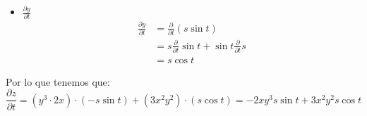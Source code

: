 \documentclass[12pt]{article}
\begin{document}
\begin{itemize}[format=\textbf]
\begin{itemize}
\begin{itemize}
   \item $\frac{\partial y}{\partial t}$
     \begin{align*}
      \frac{\partial y}{\partial t}  &=\frac{\partial}{\partial t}  \left(s \sin{t} \right)  \\
       &= s \frac{\partial}{\partial t}  \sin{t}   +  \sin{t} \frac{\partial}{\partial t}s \\
       &= s\cos{t}
     \end{align*}
  \end{itemize}
  Por lo que tenemos que:
   \[
\frac{\partial z}{\partial t} = (y^3  \cdot 2x) \cdot(-s\sin{t}) +(3x^2  y^2 ) \cdot  (s\cos{t}) =  -2xy^3s\sin{t} +3x^2y^2  s \cos{t}
\]
  
\end{itemize}

\section{}


\end{itemize}
\end{document}
